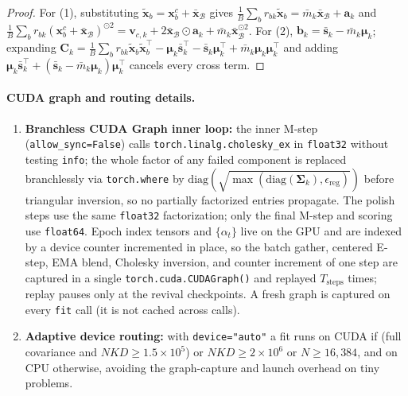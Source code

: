 \documentclass[10pt]{article} %
\newcommand{\diag}{\mathrm{diag}}
\begin{document}
\begin{proof}
For (1), substituting $\tilde{\mathbf{x}}_b = \mathbf{x}^c_b + \bar{\mathbf{x}}_{\mathcal{B}}$ gives $\frac{1}{B}\sum_b r_{bk}\tilde{\mathbf{x}}_b = \bar{m}_k \bar{\mathbf{x}}_{\mathcal{B}} + \mathbf{a}_k$ and $\frac{1}{B}\sum_b r_{bk}(\mathbf{x}^c_b + \bar{\mathbf{x}}_{\mathcal{B}})^{\odot 2} = \mathbf{v}_{c,k} + 2\bar{\mathbf{x}}_{\mathcal{B}} \odot \mathbf{a}_k + \bar{m}_k \bar{\mathbf{x}}_{\mathcal{B}}^{\odot 2}$. For (2), $\mathbf{b}_k = \bar{\mathbf{s}}_k - \bar{m}_k \boldsymbol{\mu}_k$; expanding $\mathbf{C}_k = \frac{1}{B}\sum_b r_{bk}\tilde{\mathbf{x}}_b\tilde{\mathbf{x}}_b^\top - \boldsymbol{\mu}_k \bar{\mathbf{s}}_k^\top - \bar{\mathbf{s}}_k \boldsymbol{\mu}_k^\top + \bar{m}_k \boldsymbol{\mu}_k\boldsymbol{\mu}_k^\top$ and adding $\boldsymbol{\mu}_k \bar{\mathbf{s}}_k^\top + (\bar{\mathbf{s}}_k - \bar{m}_k \boldsymbol{\mu}_k)\boldsymbol{\mu}_k^\top$ cancels every cross term.
\end{proof}

\paragraph{CUDA graph and routing details.}
\begin{enumerate}[leftmargin=*,nosep]
  \item \textbf{Branchless CUDA Graph inner loop:} the inner M-step (\texttt{allow\_sync=False}) calls \texttt{torch.linalg.cholesky\_ex} in \texttt{float32} without testing \texttt{info}; the whole factor of any failed component is replaced branchlessly via \texttt{torch.where} by $\diag(\sqrt{\max(\diag(\boldsymbol{\Sigma}_k), \epsilon_{\mathrm{reg}})})$ before triangular inversion, so no partially factorized entries propagate. The polish steps use the same \texttt{float32} factorization; only the final M-step and scoring use \texttt{float64}. Epoch index tensors and $\{\alpha_t\}$ live on the GPU and are indexed by a device counter incremented in place, so the batch gather, centered E-step, EMA blend, Cholesky inversion, and counter increment of one step are captured in a single \texttt{torch.cuda.CUDAGraph()} and replayed $T_{\mathrm{steps}}$ times; replay pauses only at the revival checkpoints. A fresh graph is captured on every \texttt{fit} call (it is not cached across calls).
  \item \textbf{Adaptive device routing:} with \texttt{device="auto"} a fit runs on CUDA if (full covariance and $NKD \ge 1.5{\times}10^5$) or $NKD \ge 2{\times}10^6$ or $N \ge 16{,}384$, and on CPU otherwise, avoiding the graph-capture and launch overhead on tiny problems.
\end{enumerate}
\end{document}
